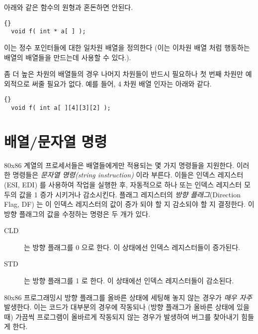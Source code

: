 아래와 같은 함수의 원형과 혼돈하면 안된다. 

\begin{lstlisting}[stepnumber=0]{}
  void f( int * a[ ] );
\end{lstlisting}

이는 정수 포인터들에 대한 일차원 배열을 정의한다 (이는 이차원 배열 처럼 행동하는
배열의 배열들을 만드는데 사용할 수 있다.).

좀 더 높은 차원의 배열들의 경우 나머지 차원들이 반드시 필요하나 첫 번째 차원만 예외적으로
써줄 필요가 없다. 예를 들어, 4 차원 배열 인자는 아래와 같다. 

\begin{lstlisting}[stepnumber=0]{}
  void f( int a[ ][4][3][2] );
\end{lstlisting}

\section{배열/문자열 명령}

80x86 계열의 프로세서들은 배열들에게만 적용되는 몇 가지 명령들을
지원한다. 이러한 명령들은 \emph{문자열 명령(string instruction)} 이라 부른다.
이들은 인덱스 레지스터(ESI, EDI) 를 사용하여 작업을 실행한 후, 자동적으로 
하나 또는 인덱스 레지스터 모두의 값을 1 증가 시키거나 감소시킨다. 
플래그 레지스터의 \emph{방향 플래그}(Direction Flag, DF)  는
이 인덱스 레지스터의 값이 증가 되야 할 지 감소되야 할 지 결정한다. 이 방향 플래그의
값을 수정하는 명령은 두 개가 있다. 

\begin{description}
\item[CLD]  는 방향 플래그를 0 으로 한다. 이 상태에선 인덱스 레지스터들이
           증가된다.
\item[STD]  는 방향 플래그를 1 로 한다. 이 상태에선 인덱스 레지스터들이 
            감소된다.
\end{description}

80x86 프로그래밍시 방향 플래그를 올바른 상태에 세팅해 놓지 않는 경우가 \emph{매우 자주}
발생한다. 이는 코드가 대부분의 경우에 작동되나 (방향 플래그가 올바른 상태에 있을 때)
가끔씩 프로그램이 올바르게 작동되지 않는 경우가 발생하여 버그를 찾아내기 힘들게 한다.

